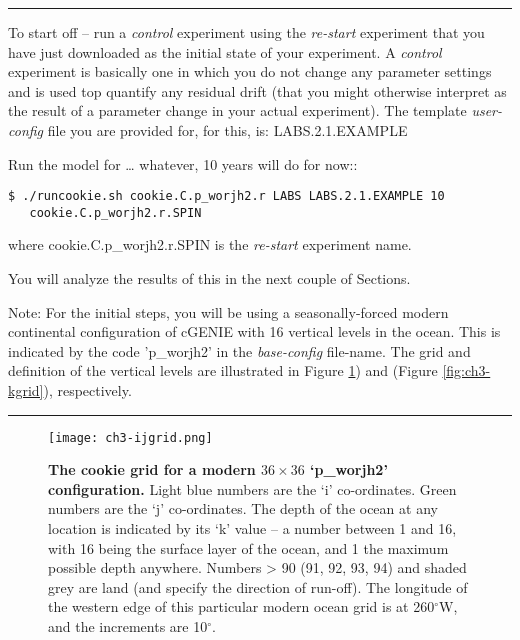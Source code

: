 \vspace{1mm}\noindent\rule{4cm}{0.5pt}\vspace{2mm}

\noindent To start off -- run a \textit{control} experiment using the \textit{re-start} experiment that you have just downloaded as the initial state of your experiment. A \textit{control} experiment is basically one in which you do not change any parameter settings and is used top quantify any residual drift (that you might otherwise interpret as the result of a parameter change in your actual experiment). The template \textit{user-config} file you are provided for, for this, is: \textsf{\footnotesize LABS.2.1.EXAMPLE}

\vspace{1mm}
Run the model for … whatever, 10 years will do for now::

\vspace{-2mm}\small\begin{verbatim}
$ ./runcookie.sh cookie.C.p_worjh2.r LABS LABS.2.1.EXAMPLE 10 
   cookie.C.p_worjh2.r.SPIN
\end{verbatim}\normalsize\vspace{-2mm}

where \textsf{\footnotesize cookie.C.p\_worjh2.r.SPIN} is the \textit{re-start} experiment name.

\vspace{1mm}
You will analyze the results of this in the next couple of Sections.

\vspace{1mm}
\noindent Note: For the initial steps, you will be using a seasonally-forced modern continental configuration of cGENIE with 16 vertical levels in the ocean. This is indicated by the code '\textsf{\footnotesize p\_worjh2}' in the \textit{base-config} file-name. The grid and definition of the vertical levels are illustrated in Figure \ref{fig:ch3-ijgrid}) and (Figure \ref{fig:ch3-kgrid}), respectively.

\vspace{1mm}\noindent\rule{4cm}{0.5pt}\vspace{2mm}

\begin{figure}
\texttt{[image: ch3-ijgrid.png]}\centering
\vspace{2mm}
\caption{
\textbf{The \textbf{cookie} grid for a modern \(36\times36\) ‘p\_worjh2’ configuration.} Light blue numbers are the ‘i’ co-ordinates. Green numbers are the ‘j’ co-ordinates.
The depth of the ocean at any location is indicated by its ‘k’ value – a number between 1 and 16, with 16 being the surface layer of the ocean, and 1 the maximum possible depth anywhere.
Numbers > 90 (91, 92, 93, 94) and shaded grey are land (and specify the direction of run-off).
The longitude of the western edge of this particular modern ocean grid is at 260$^{\circ}$W, and the increments are 10$^{\circ}$.
}
\label{fig:ch3-ijgrid}
\end{figure}

